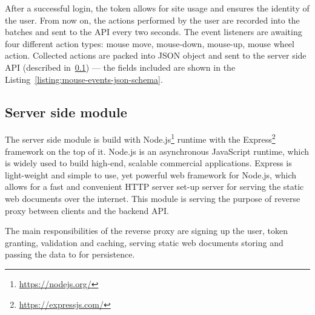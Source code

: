 After a successful login, the token allows for site usage and ensures the identity of the user.
From now on, the actions performed by the user are recorded into the batches and sent to the API every two seconds.
The event listeners are awaiting four different action types: mouse move, mouse-down, mouse-up, mouse wheel action.
Collected actions are packed into JSON object and sent to the server side API (described in~\ref{subsec:server-side-module}) --- the fields included are shown in the Listing~\ref{listing:mouse-events-json-schema}.



\subsection{Server side module}\label{subsec:server-side-module}
The server side module is build with Node.js\footnote{\url{https://nodejs.org/}} runtime with the Express\footnote{\url{https://expressjs.com/}} framework on the top of it.
Node.js is an asynchronous JavaScript runtime, which is widely used to build high-end, scalable commercial applications.
Express is light-weight and simple to use, yet powerful web framework for Node.js, which allows for a fast and convenient HTTP server set-up server for serving the static web documents over the internet.
This module is serving the purpose of reverse proxy between clients and the backend API.

The main responsibilities of the reverse proxy are signing up the user, token granting, validation and caching, serving static web documents storing and passing the data to for persistence.

